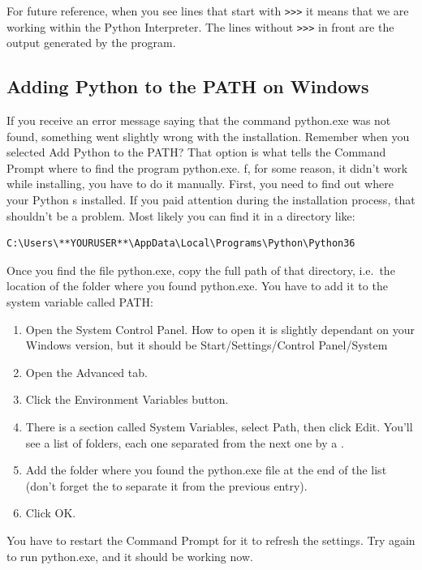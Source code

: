 For future reference, when you see lines that start with \texttt{>>>} it means that we are working within the Python Interpreter. The lines without \texttt{>>>} in front are the output generated by the program.

\subsection{Adding Python to the PATH on Windows}\label{subsec:path-windows}
If you receive an error message saying that the command python.exe was not found, something went slightly wrong with the installation. Remember when you selected Add Python to the PATH? That option is what tells the Command Prompt where to find the program python.exe. f, for some reason, it didn't work while installing, you have to do it manually. First, you need to find out where your Python s installed. If you paid attention during the installation process, that shouldn't be a problem. Most likely you can find it in a directory like:

\begin{verbatim}
C:\Users\**YOURUSER**\AppData\Local\Programs\Python\Python36
\end{verbatim}

Once you find the file python.exe, copy the full path of that directory, i.e.\ the location of the folder where you found python.exe. You have to add it to the system variable called PATH:

\begin{enumerate}
 \item Open the System Control Panel. How to open it is slightly dependant on your Windows version, but it should be Start/Settings/Control Panel/System
 \item Open the Advanced tab.
 \item Click the Environment Variables button.
 \item There is a section called System Variables, select Path, then click Edit. You'll see a list of folders, each one separated from the next one by a \py{;}.
 \item Add the folder where you found the python.exe file at the end of the list (don't forget the \py{;} to separate it from the previous entry).
 \item Click OK\@.
\end{enumerate}

You have to restart the Command Prompt for it to refresh the settings. Try again to run python.exe, and it should be working now.

